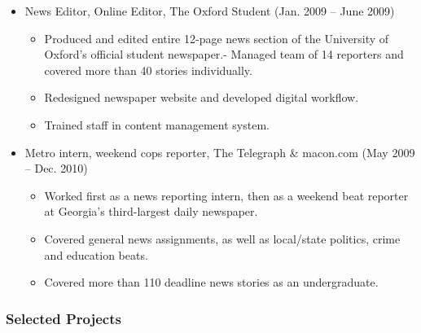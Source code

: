 \documentclass{article}
\begin{document}
\begin{itemize}[noitemsep,topsep=\mdcompacttopsep]
\item{}News Editor, Online Editor, The Oxford Student (Jan. 2009 – June 2009)

\begin{itemize}[noitemsep,topsep=\mdcompacttopsep]%

\item{}Produced and edited entire 12-page news section of the University of Oxford’s official student newspaper.- Managed team of 14 reporters and covered more than 40 stories individually.%

\item{}Redesigned newspaper website and developed digital workflow.%

\item{}Trained staff in content management system.%
\end{itemize}%

\item{}Metro intern, weekend cops reporter, The Telegraph \& macon.com (May 2009 – Dec. 2010)

\begin{itemize}[noitemsep,topsep=\mdcompacttopsep]%

\item{}Worked first as a news reporting intern, then as a weekend beat reporter at Georgia's third-largest daily newspaper.%

\item{}Covered general news assignments, as well as local/state politics, crime and education beats.%

\item{}Covered more than 110 deadline news stories as an undergraduate.%
\end{itemize}%
\end{itemize}%

\subsubsection{Selected Projects}\label{sec-selected-projects}%
\end{document}

